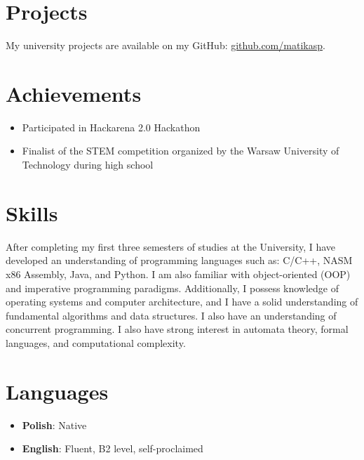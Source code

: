 \documentclass[a4paper,10pt]{article}
\begin{document}
\section*{Projects}
My university projects are available on my GitHub: \href{https://github.com/matikasp}{github.com/matikasp}.

\section*{Achievements}
\begin{itemize}[left=0pt]
    \item Participated in Hackarena 2.0 Hackathon
    \item Finalist of the STEM competition organized by the Warsaw University of Technology during high school
\end{itemize}

\section*{Skills}
After completing my first three semesters of studies at the University, I have developed an understanding of programming languages such as: C/C++, NASM x86 Assembly, Java, and Python. I am also familiar with object-oriented (OOP) and imperative programming paradigms. Additionally, I possess knowledge of operating systems and computer architecture, and I have a solid understanding of fundamental algorithms and data structures. I also have an understanding of concurrent programming.
I also have strong interest in automata theory, formal languages, and computational complexity.

\section*{Languages}
\begin{itemize}[left=0pt]
    \item \textbf{Polish}: Native
    \item \textbf{English}: Fluent, B2 level, self-proclaimed
\end{itemize}
\end{document}

